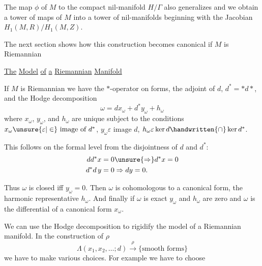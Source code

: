 The map $\phi$ of $M$ to the compact nil-manifold $H/\Gamma$ also generalizes and we obtain a tower of maps of $M$ into a tower of nil-manifolds beginning with the Jacobian $H_1(M,R)/H_1(M,Z)$.

The next section shows how this construction becomes canonical if $M$ is Riemannian

\uline{The} \uline{Model} \uline{of} \uline{a} \uline{Riemannian} \uline{Manifold}

If $M$ is Riemannian we have the $*$-operator on forms, the adjoint of $d$, $d^*=*d*$, and the Hodge decomposition
\[
\omega=dx_\omega+d^*y_\omega+h_\omega
\]
where $x_\omega$, $y_\omega$, and $h_\omega$ are unique subject to the conditions $x_\omega\unsure{\varepsilon|\in}\text{ image of }d^*$, $y_\omega\varepsilon\text{ image }d$, $h_\omega\varepsilon\ker d\handwritten{\cap}\ker d^*$.

This follows on the formal level from the \textquotedbl{}disjointness\textquotedbl{} of $d$ and $d^*$:
\[
\begin{aligned}
dd^*x=0&\unsure{\Rightarrow}d^*x=0\\
d^*d\,y=0&\Rightarrow dy=0.
\end{aligned}
\]

Thus $\omega$ is closed iff $y_\omega=0$. Then $\omega$ is cohomologous to a canonical form, the harmonic representative $h_\omega$. And finally if $\omega$ is exact $y_\omega$ and $h_\omega$ are zero and $\omega$ is the differential of a canonical form $x_\omega$.

We can use the Hodge decomposition to rigidify the model of a Riemannian manifold. In the construction of $\rho$
\[
\Lambda(x_1,x_2,\ldots;d)\xrightarrow{\rho}\{\text{smooth forms}\}
\]
we have to make various choices. For example we have to choose
